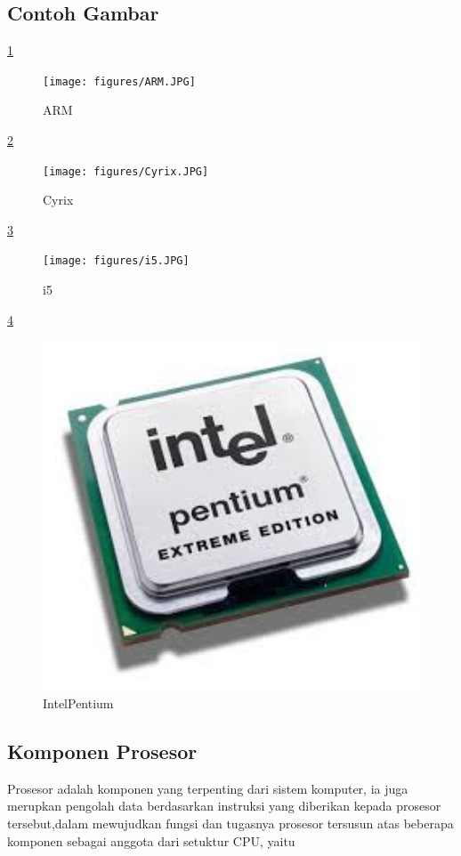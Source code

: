 \subsection{Contoh Gambar}

\ref{ARM}
\begin{figure}[ht]
\centerline{\texttt{[image: figures/ARM.JPG]}}
\caption{ARM}
\label{ARM}
\end{figure}

\ref{Cyrix}
\begin{figure}[ht]
\centerline{\texttt{[image: figures/Cyrix.JPG]}}
\caption{Cyrix}
\label{Cyrix}
\end{figure}

\ref{i5}
\begin{figure}[ht]
\centerline{\texttt{[image: figures/i5.JPG]}}
\caption{i5}
\label{i5}
\end{figure}

\ref{IntelPentium}
\begin{figure}[ht]
\centerline{\includegraphics[width=1\textwidth]{figures/IntelPentium.JPG}}
\caption{IntelPentium}
\label{IntelPentium}
\end{figure}

\subsection{Komponen Prosesor}
Prosesor adalah komponen yang terpenting dari sistem komputer, ia juga merupkan pengolah data berdasarkan instruksi yang diberikan kepada
prosesor tersebut,dalam mewujudkan fungsi dan tugasnya prosesor tersusun atas beberapa komponen sebagai anggota dari setuktur CPU, yaitu

